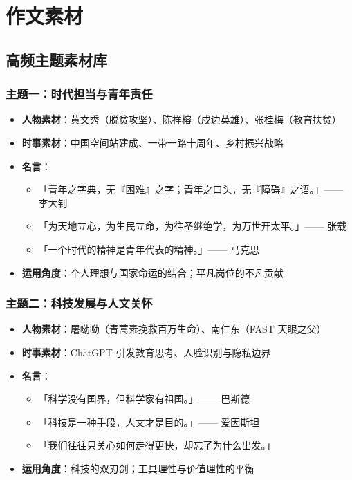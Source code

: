\section{作文素材}

\subsection{高频主题素材库}

\subsubsection{主题一：时代担当与青年责任}

\begin{itemize}
  \item \textbf{人物素材}：黄文秀（脱贫攻坚）、陈祥榕（戍边英雄）、张桂梅（教育扶贫）
  \item \textbf{时事素材}：中国空间站建成、一带一路十周年、乡村振兴战略
  \item \textbf{名言}：
    \begin{itemize}
      \item 「青年之字典，无『困难』之字；青年之口头，无『障碍』之语。」—— 李大钊
      \item 「为天地立心，为生民立命，为往圣继绝学，为万世开太平。」—— 张载
      \item 「一个时代的精神是青年代表的精神。」—— 马克思
    \end{itemize}
  \item \textbf{运用角度}：个人理想与国家命运的结合；平凡岗位的不凡贡献
\end{itemize}

\subsubsection{主题二：科技发展与人文关怀}

\begin{itemize}
  \item \textbf{人物素材}：屠呦呦（青蒿素挽救百万生命）、南仁东（FAST 天眼之父）
  \item \textbf{时事素材}：ChatGPT 引发教育思考、人脸识别与隐私边界
  \item \textbf{名言}：
    \begin{itemize}
      \item 「科学没有国界，但科学家有祖国。」—— 巴斯德
      \item 「科技是一种手段，人文才是目的。」—— 爱因斯坦
      \item 「我们往往只关心如何走得更快，却忘了为什么出发。」
    \end{itemize}
  \item \textbf{运用角度}：科技的双刃剑；工具理性与价值理性的平衡
\end{itemize}

